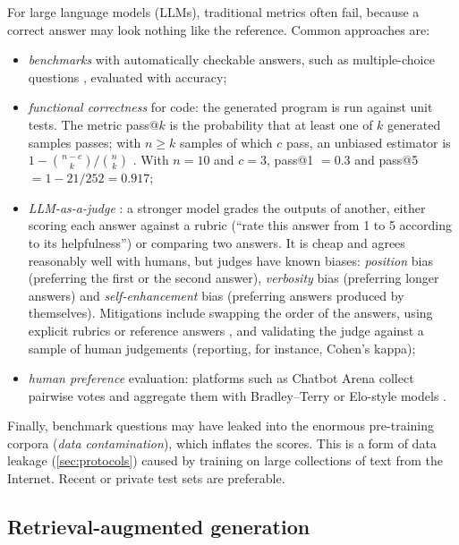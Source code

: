 For large language models (LLMs), traditional metrics often fail, because a correct answer may
look nothing like the reference. Common approaches are:
\begin{itemize}
  \item \emph{benchmarks} with automatically checkable answers, such as multiple-choice
        questions \citep[e.g.][]{hendrycks2021measuring}, evaluated with accuracy;
  \item \emph{functional correctness} for code: the generated program is run against unit
        tests. The metric pass@$k$ is the probability that at least one of $k$ generated
        samples passes; with $n\geq k$ samples of which $c$ pass, an unbiased estimator is
        $1-\binom{n-c}{k}\big/\binom{n}{k}$ \citep{chen2021evaluating}. With $n=10$ and $c=3$,
        pass@1 $=0.3$ and pass@5 $=1-21/252=0.917$;
  \item \emph{LLM-as-a-judge} \citep{zheng2023judging}: a stronger model grades the outputs of
        another, either scoring each answer against a rubric (``rate this answer from 1 to 5
        according to its helpfulness'') or comparing two answers. It is cheap and agrees
        reasonably well with humans, but judges have known biases: \emph{position} bias
        (preferring the first or the second answer), \emph{verbosity} bias (preferring longer
        answers) and \emph{self-enhancement} bias (preferring answers produced by
        themselves). Mitigations include swapping the order of the answers, using explicit
        rubrics or reference answers \citep{liu2023geval}, and validating the judge against a
        sample of human judgements (reporting, for instance, Cohen's kappa);
  \item \emph{human preference} evaluation: platforms such as Chatbot Arena collect pairwise
        votes and aggregate them with Bradley--Terry or Elo-style models
        \citep{chiang2024chatbot}.
\end{itemize}
Finally, benchmark questions may have leaked into the enormous pre-training corpora
(\emph{data contamination}), which inflates the scores. This is a form of data leakage
(\cref{sec:protocols}) caused by training on large collections of text from the Internet. Recent or private test sets are preferable.

\subsection{Retrieval-augmented generation}

